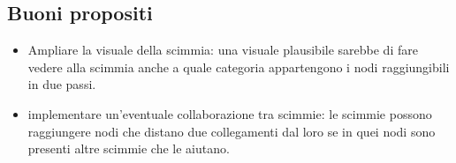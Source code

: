 \documentclass{article}
\begin{document}
\subsection{Buoni propositi}

\begin{itemize}
	\item Ampliare la visuale della scimmia: una visuale plausibile sarebbe di fare vedere alla scimmia anche a quale categoria appartengono i nodi raggiungibili in due passi.
	\item implementare un'eventuale collaborazione tra scimmie: le scimmie possono raggiungere nodi che distano due collegamenti dal loro se in quei nodi sono presenti altre scimmie che le aiutano.
\end{itemize}




















	
	
	
\end{document}
